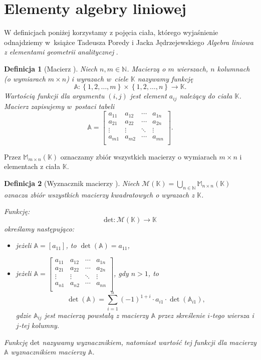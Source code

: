 \documentclass[12pt,a4paper]{report}
\newtheorem{df}{Definicja}[chapter]
\newcommand{\set}[1]{\left\lbrace {#1} \right\rbrace}
\newcommand{\setK}{\mathbb{K}}
\newcommand{\setN}{\mathbb{N}}
\newcommand{\wyznacznik}[1]{\operatorname{det}\left({#1} \right)}
\begin{document}
\section{Elementy algebry liniowej}

W definicjach poniżej korzystamy z pojęcia ciała, którego wyjaśnienie odnajdziemy w~książce Tadeusza Poredy i Jacka Jędrzejewskiego \textit{Algebra liniowa z elementami geometrii analitycznej} {\citep[Sec 4.4]{alzega}}.

\begin{df}[Macierz {\citep[Sec 8.1 Def. 8.1]{alzega}}]
Niech $n,m \in \setN$. Macierzą o $m$ wierszach, $n$ kolumnach (o wymiarach $m \times n$) i wyrazach w~ciele $\setK$ nazywamy funkcję 
$$
\mathbb{A}: \set{1,2, \ldots ,m}\times \set{1,2, \ldots ,n} \to \setK.
$$
Wartością funkcji dla argumentu $(i,j)$ jest element $a_{ij}$  należący do ciała $\setK$. Macierz zapisujemy w~postaci tabeli
$$
\mathbb{A} = \left[
        \begin{array}{cccc}
         a_{11} & a_{12} & \cdots & a_{1n} \\
         a_{21} & a_{22} & \cdots & a_{2n} \\
         \vdots & \vdots & \ddots & \vdots \\
         a_{m1} & a_{m2} & \cdots & a_{mn} \\
         \end{array}
      \right].
$$
\end{df}
\bigskip
Przez $\mathbb{M}_{m \times n}(\setK)$ oznaczamy zbiór wszystkich macierzy o wymiarach $m \times n$ i elementach z ciała $\setK$.

\begin{df}[Wyznacznik macierzy {\citep[Sec 10.1, Def. 10.1]{alzega}}]
Niech $\mathcal{M}(\setK)=\bigcup_{n\in \setN} \mathbb{M}_{n \times n}(\setK)$ oznacza zbiór wszystkich macierzy kwadratowych o wyrazach z $\setK$.

Funkcję:
$$
\mathrm{det} : \mathcal{M}(\setK) \to \setK
$$ 
określamy następująco:
\begin{itemize}
\item jeżeli $\mathbb{A}=[a_{11}]$, to $\wyznacznik{\mathbb{A}}=a_{11}$,
\item jeżeli $\mathbb{A} = \left[
        \begin{array}{cccc}
         a_{11} & a_{12} & \cdots & a_{1n} \\
         a_{21} & a_{22} & \cdots & a_{2n} \\
         \vdots & \vdots & \ddots & \vdots \\
         a_{n1} & a_{n2} & \cdots & a_{nn} \\
         \end{array}
      \right]$, gdy $n>1$, to
$$
\wyznacznik{\mathbb{A}} = \sum_{i=1}^n (-1)^{1+i} \cdot a_{i1} \cdot \wyznacznik{\mathbb{A}_{i1}},
$$
gdzie 
$\mathbb{A}_{ij}$ jest macierzą powstałą z macierzy $\mathbb{A}$ przez skreślenie $i$-tego wiersza i $j$-tej kolumny.
\end{itemize}
Funkcję $\mathrm{det}$ nazywamy wyznacznikiem, natomiast wartość tej funkcji dla macierzy $\mathbb{A}$ wyznacznikiem macierzy $\mathbb{A}$.
\end{df}
\end{document}
